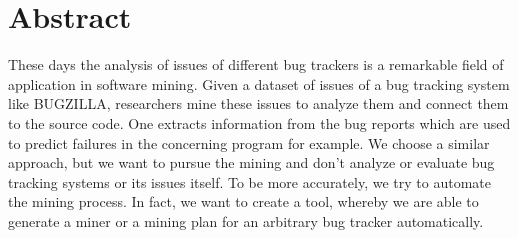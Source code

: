 
\chapter*{Abstract}
\thispagestyle {empty}
These days the analysis of issues of different bug trackers is a remarkable field of application in software mining. Given a dataset of issues of a bug tracking system like BUGZILLA, researchers mine these issues to analyze them and connect them to the source code. One extracts information from the bug reports which are used to predict failures in the concerning program for example. We choose a similar approach, but we want to pursue the mining and don't analyze or evaluate bug tracking systems or its issues itself. To be more accurately, we try to automate the mining process. In fact, we want to create a tool, whereby we are able to generate a miner or a mining plan for an arbitrary bug tracker automatically.

